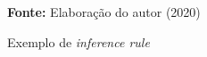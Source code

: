 \begin{figure}[ht!]
\centering

\caption{\textmd{Exemplo de \textit{inference rule}}}
\label{fig:inferencerule}

\par\medskip\textbf{Fonte:} Elaboração do autor (2020) \par\medskip

\end{figure}
